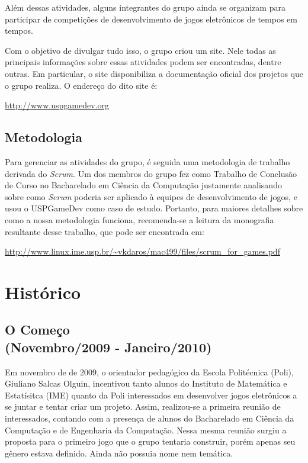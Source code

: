 \documentclass[12pt,onecolumn,a4paper]{article}
\begin{document}
        Além dessas atividades, alguns integrantes do grupo ainda se organizam para participar de
        competições de desenvolvimento de jogos eletrônicos de tempos em tempos.
        
        Com o objetivo de divulgar tudo isso, o grupo criou um site. Nele todas as principais
        informações sobre essas atividades podem ser encontradas, dentre outras. Em particular, o
        site disponibiliza a documentação oficial dos projetos que o grupo realiza. O endereço do
        dito site é:
        
        \begin{center}
            \footnotesize
            \url{http://www.uspgamedev.org}
        \end{center}
    
    \clearpage
    \subsection{Metodologia}
    \label{sec:metodologia}
        Para gerenciar as atividades do grupo, é seguida uma metodologia de trabalho derivada do
        {\it Scrum}. Um dos membros do grupo fez como Trabalho de Conclusão de Curso no Bacharelado
        em Ciência da Computação justamente analisando sobre como {\it Scrum} poderia ser aplicado à
        equipes de desenvolvimento de jogos, e usou o USPGameDev como caso de estudo. Portanto, para
        maiores detalhes sobre como a nossa metodologia funciona, recomenda-se a leitura da
        monografia resultante desse trabalho, que pode ser encontrada em:
        
        \begin{center}
            \footnotesize
            \url{http://www.linux.ime.usp.br/~vkdaros/mac499/files/scrum_for_games.pdf}
        \end{center}

\clearpage
\section{\LARGE Histórico}
    
    \subsection{O Começo \\ {\small(Novembro/2009 - Janeiro/2010)}}
        Em novembro de de 2009, o orientador pedagógico da Escola Politécnica (Poli), Giuliano
        Salcas Olguin, incentivou tanto alunos do Instituto de Matemática e Estatísitca (IME) quanto
        da Poli interessados em desenvolver jogos eletrônicos a se juntar e tentar criar um projeto.
        Assim, realizou-se a primeira reunião de interessados, contando com a presença de alunos do
        Bacharelado em Ciência da Computação e de Engenharia da Computação. Nessa mesma reunião
        surgiu a proposta para o primeiro jogo que o grupo tentaria construir, porém apenas seu
        gênero estava definido. Ainda não possuia nome nem temática.
\end{document}
